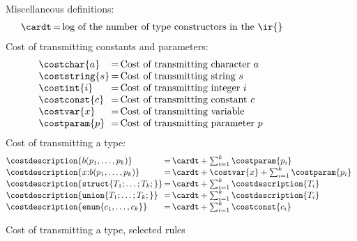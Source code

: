\begin{figure}
Miscellaneous definitions:
\[
\begin{array}{@{\,}l@{\,}c@{\,}l}
\cardt &=& \mbox{log of the number of type constructors in the \ir{}}
\end{array}
\]
Cost of transmitting constants and parameters:
\[
\begin {array} {@{}l@{\,}c@{\,}l}
\costchar{a}  &=& \mbox{Cost of transmitting character } a \\
\coststring{s}  &=& \mbox{Cost of transmitting string } s \\
\costint{i}  &=& \mbox{Cost of transmitting integer } i \\
\costconst{c}  &=& \mbox{Cost of transmitting constant } c \\
\costvar{x} &=& \mbox{Cost of transmitting variable } \\
\costparam{p}  &=& \mbox{Cost of transmitting parameter } p \\
\end{array}
\]
Cost of transmitting a type:
\[
\begin{array}{@{}l@{\,}c@{\,}l}
\costdescription{b(p_1,\ldots,p_k)} &=& 
  \cardt + \sum_{i=1}^{k} \costparam{p_i} \\
\costdescription{x{:}b(p_1,\ldots,p_k)} &=& 
  \cardt + \costvar{x} + \sum_{i=1}^{k} \costparam{p_i} \\
\costdescription{\mathtt{struct \{} T_1;\ldots ;T_k; \mathtt{\}}} &=& 
  \cardt + \sum_{i=1}^{k} \costdescription{T_i} \\
\costdescription{\mathtt{union \{} T_1; \ldots ;T_k; \mathtt{\}}} &=& 
  \cardt + \sum_{i=1}^{k} \costdescription{T_i} \\
\costdescription{\mathtt{enum \{} c_1,\ldots,c_k \mathtt{\}}} &=& 
  \cardt + \sum_{i=1}^{k} \costconst{c_i} \\
\end{array}
\]

\caption {Cost of transmitting a type, selected rules}
\label{fig:cost-type}
\end{figure}

